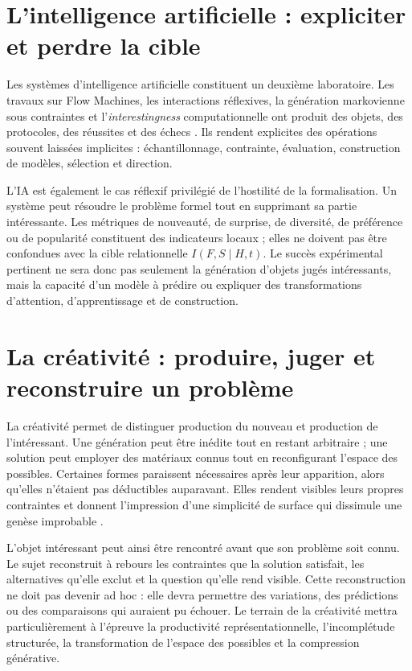 \documentclass[11pt,a4paper]{article}
\begin{document}
\section{L'intelligence artificielle : expliciter et perdre la cible}

Les systèmes d'intelligence artificielle constituent un deuxième laboratoire.
Les travaux sur Flow Machines, les interactions réflexives, la génération
markovienne sous contraintes et l'\emph{interestingness} computationnelle ont
produit des objets, des protocoles, des réussites et des échecs
\parencite{pachet2006clefs,pachet2008machines,pachet2012virtuosity,pachet2021assisted,pachet2026markov}.
Ils rendent explicites des opérations souvent laissées implicites :
échantillonnage, contrainte, évaluation, construction de modèles, sélection et
direction.

L'IA est également le cas réflexif privilégié de l'hostilité de la
formalisation. Un système peut résoudre le problème formel tout en supprimant sa
partie intéressante. Les métriques de nouveauté, de surprise, de diversité, de
préférence ou de popularité constituent des indicateurs locaux ; elles ne
doivent pas être confondues avec la cible relationnelle
\(I(F,S\mid H,t)\). Le succès expérimental pertinent ne sera donc pas seulement
la génération d'objets jugés intéressants, mais la capacité d'un modèle à
prédire ou expliquer des transformations d'attention, d'apprentissage et de
construction.

\section{La créativité : produire, juger et reconstruire un problème}

La créativité permet de distinguer production du nouveau et production de
l'intéressant. Une génération peut être inédite tout en restant arbitraire ;
une solution peut employer des matériaux connus tout en reconfigurant l'espace
des possibles. Certaines formes paraissent nécessaires après leur apparition,
alors qu'elles n'étaient pas déductibles auparavant. Elles rendent visibles
leurs propres contraintes et donnent l'impression d'une simplicité de surface
qui dissimule une genèse improbable
\parencite{pachet2026impossibilite,pachet2027virtuosite}.

L'objet intéressant peut ainsi être rencontré avant que son problème soit
connu. Le sujet reconstruit à rebours les contraintes que la solution satisfait,
les alternatives qu'elle exclut et la question qu'elle rend visible. Cette
reconstruction ne doit pas devenir ad hoc : elle devra permettre des variations,
des prédictions ou des comparaisons qui auraient pu échouer. Le terrain de la
créativité mettra particulièrement à l'épreuve la productivité
représentationnelle, l'incomplétude structurée, la transformation de l'espace
des possibles et la compression générative.
\end{document}
